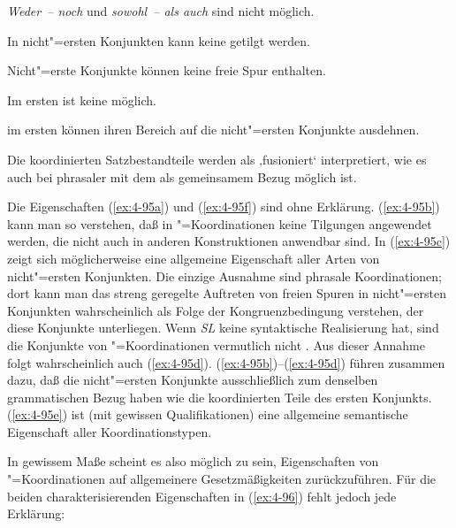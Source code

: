 \documentclass[output=paper]{langsci/langscibook}
\begin{document}
\begin{exe}
\ex
\label{ex:4-95}
\begin{xlist}
\ex%
\label{ex:4-95a}
\textit{Weder~-- noch} und \textit{sowohl~-- als auch} sind nicht möglich.

\ex%
\label{ex:4-95b}
In nicht"=ersten Konjunkten kann keine  getilgt werden.

\ex%
\label{ex:4-95c}
Nicht"=erste Konjunkte können keine freie Spur enthalten.

\ex%
\label{ex:4-95d}
Im ersten  ist keine  möglich.

\ex%
\label{ex:4-95e}
 im ersten  können ihren Bereich auf die nicht"=ersten Konjunkte ausdehnen.

\ex%
\label{ex:4-95f}
Die koordinierten Satzbestandteile werden als ‚fusioniert‘ interpretiert, wie es
auch bei phrasaler  mit dem  als gemeinsamem Bezug
möglich ist.
\end{xlist}
\end{exe}
Die Eigenschaften (\ref{ex:4-95a}) und (\ref{ex:4-95f}) sind ohne
Erklärung. (\ref{ex:4-95b}) kann man so verstehen, daß in
"=Koordinationen keine Tilgungen angewendet werden, die nicht auch
in anderen Konstruktionen anwendbar sind. In (\ref{ex:4-95c}) zeigt
sich möglicherweise eine allgemeine Eigenschaft aller Arten von
nicht"=ersten Konjunkten. Die einzige Ausnahme sind phrasale
Koordinationen; dort kann man das streng geregelte Auftreten von
freien Spuren in nicht"=ersten Konjunkten wahrscheinlich als Folge der
Kongruenzbedingung verstehen, der diese Konjunkte unterliegen. Wenn
\textit{SL} keine syntaktische Realisierung hat, sind die Konjunkte
von "=Koordinationen vermutlich nicht . Aus dieser Annahme
folgt wahrscheinlich auch (\ref{ex:4-95d}). (\ref{ex:4-95b})--(\ref{ex:4-95d}) führen zusammen dazu, daß
die nicht"=ersten Konjunkte ausschließlich zum  denselben
grammatischen Bezug haben wie die koordinierten Teile des ersten
Konjunkts. (\ref{ex:4-95e}) ist (mit gewissen Qualifikationen) eine allgemeine
semantische Eigenschaft aller Koordinationstypen.

In gewissem Maße scheint es also möglich zu sein, Eigenschaften von "=Koordinationen auf allgemeinere Gesetzmäßigkeiten zurückzuführen. Für die beiden charakterisierenden Eigenschaften in (\ref{ex:4-96}) fehlt jedoch jede Erklärung:

\end{document}
